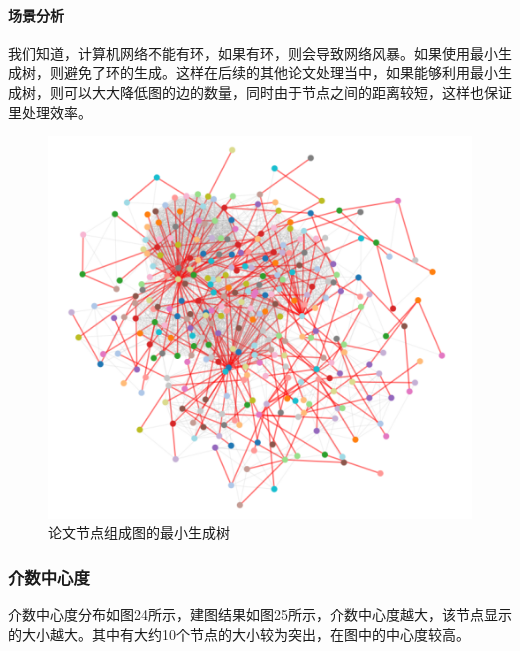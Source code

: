 \documentclass[UTF8, onecolumn, a4paper]{article}
\begin{document}
    \paragraph{场景分析}我们知道，计算机网络不能有环，如果有环，则会导致网络风暴。如果使用最小生成树，则避免了环的生成。这样在后续的其他论文处理当中，如果能够利用最小生成树，则可以大大降低图的边的数量，同时由于节点之间的距离较短，这样也保证里处理效率。
\begin{figure}[H]
	\centering
	\includegraphics[width=0.6\linewidth]{../pictures/show18}
	\caption{论文节点组成图的最小生成树}
\end{figure}
\subsubsection{介数中心度}
    介数中心度分布如图24所示，建图结果如图25所示，介数中心度越大，该节点显示的大小越大。其中有大约10个节点的大小较为突出，在图中的中心度较高。
    
\end{document}
